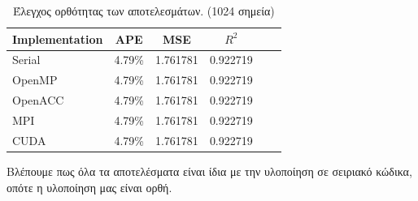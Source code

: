 \documentclass[11pt]{scrartcl} %
\begin{document}
\begin{table}[H]
    \centering
    \begin{tabular}{|l|c|c|c|c|c|}
    \hline
        Implementation & APE   & MSE   & $R^2$ \\ \hline
        Serial         & 4.79\% & 1.761781 & 0.922719 \\
        OpenMP         & 4.79\% & 1.761781 & 0.922719 \\
        OpenACC        & 4.79\% & 1.761781 & 0.922719 \\
        MPI            & 4.79\% & 1.761781 & 0.922719 \\
        CUDA           & 4.79\% & 1.761781 & 0.922719 \\
    \hline
    \end{tabular}
    \caption{Έλεγχος ορθότητας των αποτελεσμάτων. (1024 σημεία)}
\end{table}

Βλέπουμε πως όλα τα αποτελέσματα είναι ίδια με την υλοποίηση σε σειριακό κώδικα, οπότε η υλοποίηση μας είναι ορθή.


\end{document}
